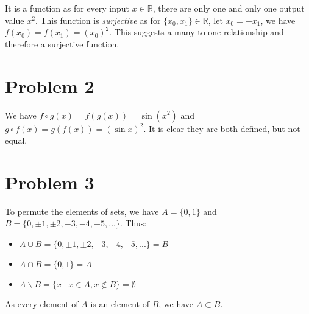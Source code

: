 \documentclass[11pt]{article}
\begin{document}
It is a function as for every input $x \in \mathbb{R}$, there are only one and only one output value $x^2$. This function is \textit{surjective} as for $\{x_0, x_1\} \in \mathbb{R}$, let $x_0 = -x_1$, we have $f(x_0) = f(x_1) = (x_0)^2$. This suggests a many-to-one relationship and therefore a surjective function.

\section*{Problem 2}

We have $f \circ g(x) = f(g(x)) = \sin(x^2)$ and  $g \circ f(x) = g(f(x)) = (\sin x)^2$. It is clear they are both defined, but not equal.

\section*{Problem 3}

To permute the elements of sets, we have $A = \{0, 1\}$ and $B = \{0, \pm1, \pm2, -3, -4, -5, ...\}$. Thus:

\begin{itemize}
    \item $A \cup B = \{0, \pm1, \pm2, -3, -4, -5, ...\} = B$
    \item $A \cap B = \{0, 1\} = A$
    \item $A \backslash B = \{x \mid x \in A, x \not\in B\} = \emptyset$
\end{itemize}

\noindent As every element of $A$ is an element of $B$, we have $A \subset B$.
\end{document}
